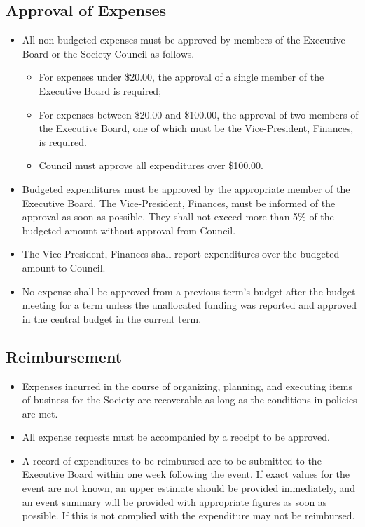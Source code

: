 \subsection{Approval of Expenses}
\begin{itemize}
\item All non-budgeted expenses must be approved by members of the Executive Board or the Society Council as follows.
\begin{itemize}
\item For expenses under \$20.00, the approval of a single member of the Executive Board is required;
\item For expenses between \$20.00 and \$100.00, the approval of two members of the Executive Board, one of which must be the Vice-President, Finances, is required.
\item Council must approve all expenditures over \$100.00.
\end{itemize}
\item Budgeted expenditures must be approved by the appropriate member of the Executive Board. The Vice-President, Finances, must be informed of the approval as soon as possible. They shall not exceed more than 5\% of the budgeted amount without approval from Council.
\item The Vice-President, Finances shall report expenditures over the budgeted amount to Council.
\item No expense shall be approved from a previous term's budget after the budget meeting for a term unless the unallocated funding was reported and approved in the central budget in the current term.
\end{itemize}

\subsection{Reimbursement}
\begin{itemize}
\item Expenses incurred in the course of organizing, planning, and executing items of business for the Society are recoverable as long as the conditions in policies are met.
\item All expense requests must be accompanied by a receipt to be approved.
\item A record of expenditures to be reimbursed are to be submitted to the Executive Board within one week following the event. If exact values for the event are not known, an upper estimate should be provided immediately, and an event summary will be provided with appropriate figures as soon as possible. If this is not complied with the expenditure may not be reimbursed.
\end{itemize}

